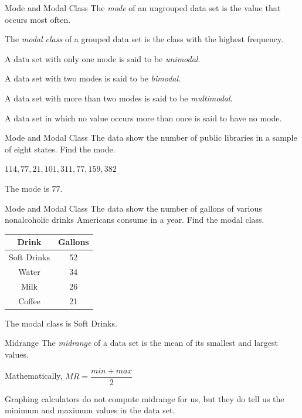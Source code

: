\documentclass[t, aspectratio=169]{beamer}
\newcommand{\?}{\stackrel{?}{=}}
\begin{document}
	\begin{frame}{Mode and Modal Class}
		The \textit{mode} of an ungrouped data set is the value that occurs most often. \pause
		
		The \textit{modal class} of a grouped data set is the class with the highest frequency. \pause
		
		A data set with only one mode is said to be \textit{unimodal}. \pause
		
		A data set with two modes is said to be \textit{bimodal}. \pause
		
		A data set with more than two modes is said to be \textit{multimodal}. \pause
		
		A data set in which no value occurs more than once is said to have no mode.
	\end{frame}

	\begin{frame}{Mode and Modal Class}
		The data show the number of public libraries in a sample of eight states. Find the mode.
		
		$114, 77, 21, 101, 311, 77, 159, 382$ \pause
		
		The mode is $77$. \pause
	\end{frame}

	\begin{frame}{Mode and Modal Class}
		The data show the number of gallons of various nonalcoholic drinks Americans consume in a year. Find the modal class.
		
		\begin{tabular}{|c|c|} \hline
			Drink & Gallons \\ \hline
			Soft Drinks & 52 \\ \hline
			Water & 34 \\ \hline
			Milk & 26 \\ \hline
			Coffee & 21 \\ \hline
		\end{tabular} \pause
		
		The modal class is Soft Drinks.
	\end{frame}

	\begin{frame}{Midrange}
		The \textit{midrange} of a data set is the mean of its smallest and largest values.
		
		Mathematically, $MR = \dfrac{min + max}{2}$ \pause
		
		Graphing calculators do not compute midrange for us, but they do tell us the minimum and maximum values in the data set.
	\end{frame}
\end{document}
